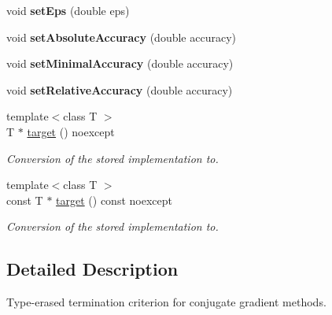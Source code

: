 \begin{DoxyCompactItemize}
\item 
\hypertarget{classSpacy_1_1CG_1_1TerminationCriterion_a59099ba9af213a66a33bb5b7c7061e11}{void {\bfseries set\-Eps} (double eps)}\label{classSpacy_1_1CG_1_1TerminationCriterion_a59099ba9af213a66a33bb5b7c7061e11}

\item 
\hypertarget{classSpacy_1_1CG_1_1TerminationCriterion_a833711290bf75d7cf7450f163f537510}{void {\bfseries set\-Absolute\-Accuracy} (double accuracy)}\label{classSpacy_1_1CG_1_1TerminationCriterion_a833711290bf75d7cf7450f163f537510}

\item 
\hypertarget{classSpacy_1_1CG_1_1TerminationCriterion_a5e16822944d08001fde24212857f4b2a}{void {\bfseries set\-Minimal\-Accuracy} (double accuracy)}\label{classSpacy_1_1CG_1_1TerminationCriterion_a5e16822944d08001fde24212857f4b2a}

\item 
\hypertarget{classSpacy_1_1CG_1_1TerminationCriterion_acea2a40d3f62813a3daa69ebbe8f2d16}{void {\bfseries set\-Relative\-Accuracy} (double accuracy)}\label{classSpacy_1_1CG_1_1TerminationCriterion_acea2a40d3f62813a3daa69ebbe8f2d16}

\item 
{\footnotesize template$<$class T $>$ }\\\-T $\ast$ \hyperlink{classSpacy_1_1CG_1_1TerminationCriterion_abafe9b4bb23fcd4fddfe747eeaa23b03}{target} () noexcept
\begin{DoxyCompactList}\small\item\em \-Conversion of the stored implementation to. \end{DoxyCompactList}\item 
{\footnotesize template$<$class T $>$ }\\const \-T $\ast$ \hyperlink{classSpacy_1_1CG_1_1TerminationCriterion_add14819a4372b5f193dc0adb2321e419}{target} () const noexcept
\begin{DoxyCompactList}\small\item\em \-Conversion of the stored implementation to. \end{DoxyCompactList}\end{DoxyCompactItemize}


\subsection{\-Detailed \-Description}
\-Type-\/erased termination criterion for conjugate gradient methods. 

